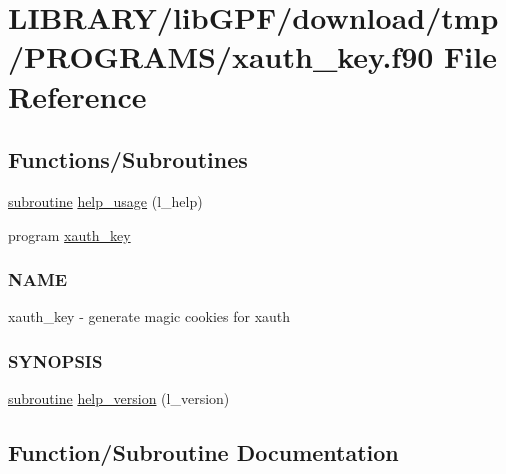 \hypertarget{xauth__key_8f90}{}\section{L\+I\+B\+R\+A\+R\+Y/lib\+G\+P\+F/download/tmp/\+P\+R\+O\+G\+R\+A\+M\+S/xauth\+\_\+key.f90 File Reference}
\label{xauth__key_8f90}
\subsection*{Functions/\+Subroutines}
\begin{DoxyCompactItemize}
\item 
\hyperlink{M__stopwatch_83_8txt_acfbcff50169d691ff02d4a123ed70482}{subroutine} \hyperlink{xauth__key_8f90_a3e09a3b52ee8fb04eeb93fe5761626a8}{help\+\_\+usage} (l\+\_\+help)
\item 
program \hyperlink{xauth__key_8f90_a0f9a35aa83e47ebe911d6c02ac4f5798}{xauth\+\_\+key}
\begin{DoxyCompactList}\small\item\em \subsubsection*{N\+A\+ME}

xauth\+\_\+key -\/ generate magic cookies for xauth \subsubsection*{S\+Y\+N\+O\+P\+S\+IS}\end{DoxyCompactList}\item 
\hyperlink{M__stopwatch_83_8txt_acfbcff50169d691ff02d4a123ed70482}{subroutine} \hyperlink{xauth__key_8f90_ad2aaabc58e93e13e8a0d5acf843eb5d0}{help\+\_\+version} (l\+\_\+version)
\end{DoxyCompactItemize}


\subsection{Function/\+Subroutine Documentation}
\mbox{\label{xauth__key_8f90_a3e09a3b52ee8fb04eeb93fe5761626a8}} 
